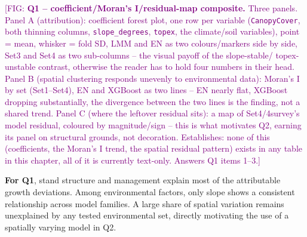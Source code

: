 \documentclass[logo,msc,ai]{infthesis}           %
\newcommand{\fig}[1]{\textcolor{purple}{[FIG: #1]}}
\begin{document}
\fig{\textbf{Q1 -- coefficient/Moran's I/residual-map composite.} Three panels.
Panel A (attribution): coefficient forest plot, one row per variable (\texttt{CanopyCover},
both thinning columns, \texttt{slope\_degrees}, \texttt{topex}, the climate/soil
variables), point = mean, whisker = fold SD, LMM and EN as two colours/markers side by
side, Set3 and Set4 as two sub-columns -- the visual payoff of the slope-stable/
topex-unstable contrast, otherwise the reader has to hold four numbers in their head.
Panel B (spatial clustering responds unevenly to environmental data): Moran's I by set
(Set1--Set4), EN and XGBoost as two lines -- EN nearly flat, XGBoost dropping
substantially, the divergence between the two lines is the finding, not a shared trend.
Panel C (where the leftover residual sits): a map of Set4/4survey's model residual,
coloured by magnitude/sign -- this is what motivates Q2, earning its panel on
structural grounds, not decoration. Establishes: none of this (coefficients, the
Moran's I trend, the spatial residual pattern) exists in any table in this chapter, all
of it is currently text-only. Answers Q1 items 1--3.}



\textbf{For Q1}, stand structure and management explain most of the attributable growth deviations. Among environmental factors, only slope shows a consistent relationship across model families. A large share of spatial variation remains unexplained by any tested environmental set, directly motivating the use of a spatially varying model in Q2.

\end{document}
